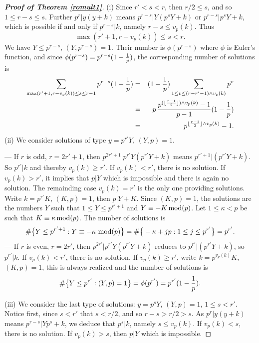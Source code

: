 \documentclass[11pt,draft,reqno]{amsart}
\theoremstyle{definition}
\theoremstyle{remarks}
\numberwithin{equation}{section}
\def \noi{{\noindent}}
\begin{document}
\begin{proof}[\bf Proof of Theorem \ref{romult1}]
\noi (i) Since $r'<s<r$, then $ r/2 \le  s $, and so $1\le r-s\le s$.  Further 
$p^r| y(y+k)$ means $p^{r-s}|  Y(p^sY+k)$ or
$p^{r-s}|  p^sY +k  $,   which is possible if and only if
$p^{r-s}|  k
$, namely $ r-s \le v_p(k)
$.  Thus 
$$\max(r'+1,r-v_p(k)) \le s<r.$$
 We have $Y\le p^{r-s}$, $(Y,p^{r-s})=1$. Their number
  is   $\phi(p^{r-s})$ where $\phi$ is Euler's function, and since $\phi(p^{r-s})=p^{r-s}(1-{1\over p}) $, 
the corresponding number of solutions is 
\begin{eqnarray*} \sum_{\max(r'+1,r-v_p(k)) \le s\le r -1 } p^{r-s}(1-{1\over p})   &=&   (1-{1\over p})\sum_{1\le  v  
\le (r-r'-1)\wedge v_p(k)}  
p^{v}
\cr &  =&  p\, {p^{(\lfloor {r-1\over 2}\rfloor )\wedge v_p(k)}-1\over p-1}(1-{1\over p}) 
\cr &  =&  
p^{\lfloor {r-1\over 2}\rfloor\wedge v_p(k)} -1   . 
\end{eqnarray*}
   (ii)      We consider   solutions of type    $y=p^{r'}Y$, $(Y,p)=1$. 
\smallskip\par  ---  If $r$ is odd, $r=2r'+1$, then  $p^{2r'+1}| p^{ r' }Y(p^{ r' }Y+k)$ means
$p^{ r'+1}|   (p^{ r' }Y+k)$. So $p^{ r'}|k$ and thereby $v_p(k)\ge r'$.
  If $v_p(k)< r'$, there is   no solution.  If $v_p(k)>  r'$, it implies that  $p|Y$ which is impossible and   there is   again no  
solution. 
 The remainding case $v_p(k)=  r'$ is the only one providing solutions. Write $k=p^{ r' }K $, $(K,p)=1$, then $p|Y+K$. Since
$(K,p)=1$, the solutions are the numbers
$Y$ such that
$1\le Y\le  p^{ r' +1}$ and 
$Y\equiv -K\, {\rm mod}(p)$. Let $1\le \kappa<p$ be such that $K  \equiv \kappa\, {\rm mod}(p)$.
The number of solutions is
\begin{equation} \#\big\{Y\le  p^{ r' +1} : Y\equiv -\kappa\  {\rm mod}(p)\big\} =\#\big\{ - \kappa  +jp: 1\le j\le p^{ r' }\big\}= p^{
r'  }.
\end{equation}
   --- If $r$ is even, $r=2r'$, then  $p^{2r' }| p^{ r' }Y(p^{ r' }Y+k)$ reduces to $p^{ r' }|  (p^{ r' }Y+k)$, so $p^{
r'}|k$. If $v_p(k)< r'$, there is no solution.  If $v_p(k)\ge   r'$,  write $k=p^{v_p(k) }K$, $(K,p)=1$, this is always realized and   the
number of solutions is
$$\#\big\{Y\le  p^{ r' } :  (Y,p)=1\big\} =\phi(p^{ r' })=p^{ r' }(1-{1\over p}) .$$ 
 \par \noi (iii) We consider the last type of  solutions: $y=p^sY$, $(Y,p)=1$,    $1\le s< 
r'$.  Notice first,  since $s<r'$ that  $s<r/2$, and so $r-s>r/2>s$.
As
$p^r| y(y+k)$ means 
 $p^{r-s}|   Yp^s+k $, we deduce that $p^s|k$, namely $ s\le v_p(k) $. 
 If $  v_p(k)<s $, there is no solution.  
  If $   v_p(k)>s $, then $p|Y$ which is impossible.  


\end{proof}
\end{document}
